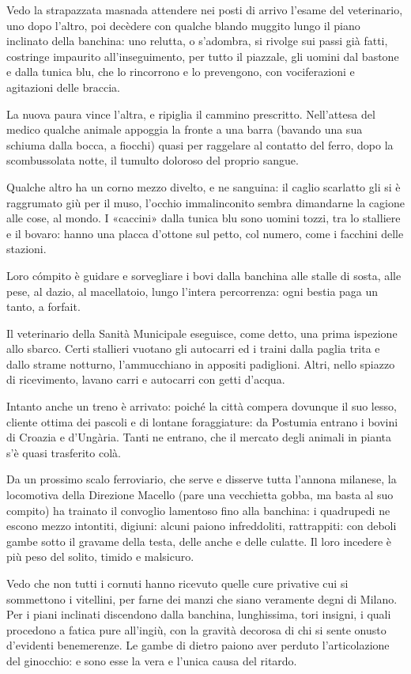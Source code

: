 Vedo la strapazzata masnada attendere nei posti di arrivo l’esame del veterinario, uno dopo l’altro, poi decèdere con qualche blando muggito lungo il piano inclinato della banchina: uno relutta, o s’adombra, si rivolge sui passi già fatti, costringe impaurito all’inseguimento, per tutto il piazzale, gli uomini dal bastone e dalla tunica blu, che lo rincorrono e lo prevengono, con vociferazioni e agitazioni delle braccia.

La nuova paura vince l’altra, e ripiglia il cammino prescritto. Nell’attesa del medico qualche animale appoggia la fronte a una barra (bavando una sua schiuma dalla bocca, a fiocchi) quasi per raggelare al contatto del ferro, dopo la scombussolata notte, il tumulto doloroso del proprio sangue.

Qualche altro ha un corno mezzo divelto, e ne sanguina: il caglio scarlatto gli si è raggrumato giù per il muso, l’occhio immalinconito sembra dimandarne la cagione alle cose, al mondo. I «caccini» dalla tunica blu sono uomini tozzi, tra lo stalliere e il bovaro: hanno una placca d’ottone sul petto, col numero, come i facchini delle stazioni.

Loro cómpito è guidare e sorvegliare i bovi dalla banchina alle stalle di sosta, alle pese, al dazio, al macellatoio, lungo l’intera percorrenza: ogni bestia paga un tanto, a forfait.

Il veterinario della Sanità Municipale eseguisce, come detto, una prima ispezione allo sbarco. Certi stallieri vuotano gli autocarri ed i traini dalla paglia trita e dallo strame notturno, l’ammucchiano in appositi padiglioni. Altri, nello spiazzo di ricevimento, lavano carri e autocarri con getti d’acqua.

Intanto anche un treno è arrivato: poiché la città compera dovunque il suo lesso, cliente ottima dei pascoli e di lontane foraggiature: da Postumia entrano i bovini di Croazia e d’Ungària. Tanti ne entrano, che il mercato degli animali in pianta s’è quasi trasferito colà.

Da un prossimo scalo ferroviario, che serve e disserve tutta l’annona milanese, la locomotiva della Direzione Macello (pare una vecchietta gobba, ma basta al suo compito) ha trainato il convoglio lamentoso fino alla banchina: i quadrupedi ne escono mezzo intontiti, digiuni: alcuni paiono infreddoliti, rattrappiti: con deboli gambe sotto il gravame della testa, delle anche e delle culatte. Il loro incedere è più peso del solito, timido e malsicuro.

Vedo che non tutti i cornuti hanno ricevuto quelle cure privative cui si sommettono i vitellini, per farne dei manzi che siano veramente degni di Milano. Per i piani inclinati discendono dalla banchina, lunghissima, tori insigni, i quali procedono a fatica pure all’ingiù, con la gravità decorosa di chi si sente onusto d’evidenti benemerenze. Le gambe di dietro paiono aver perduto l’articolazione del ginocchio: e sono esse la vera e l’unica causa del ritardo.

